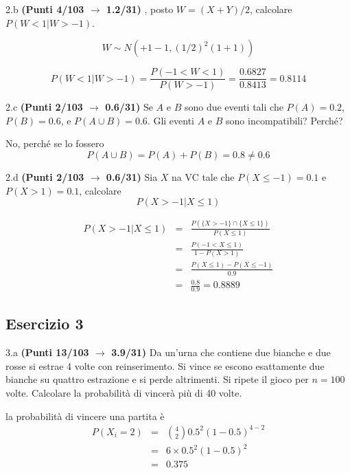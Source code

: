 \documentclass[
  11pt,
]{book}
\theoremstyle{mytheoremstyle}
\theoremstyle{mydefstyle}
\newenvironment{sol}
  {
  \begin{tcolorbox}[enhanced,breakable,arc=0.1mm,boxrule=1pt,colback=white,colframe=iblue,
  title=\bf \fontfamily{lmss}\selectfont \hspace{.5 cm} Soluzione,drop fuzzy shadow]

}{
\end{tcolorbox}
  }
\begin{document}
2.b \textbf{(Punti 4/103 \(\rightarrow\) 1.2/31)} , posto \(W=(X+Y)/2\), calcolare \(P(W<1|W>-1)\).

\begin{sol}
\[
W\sim N(+1-1,(1/2)^2(1+1))
\]

\[ 
P(W<1|W>-1)=\frac{P(-1<W<1)}{P(W>-1)}=\frac{0.6827}{0.8413}=0.8114
\]

\end{sol}

2.c \textbf{(Punti 2/103 \(\rightarrow\) 0.6/31)} Se \(A\) e \(B\) sono due eventi tali che \(P(A)=0.2\), \(P(B)=0.6\), e \(P(A\cup B)=0.6\). Gli eventi \(A\) e \(B\) sono incompatibili? Perché?

\begin{sol}
No, perché se lo fossero
\[
P(A\cup B)=P(A)+P(B)=0.8\ne 0.6
\]

\end{sol}

2.d \textbf{(Punti 2/103 \(\rightarrow\) 0.6/31)} Sia \(X\) na VC tale che \(P(X\le-1)=0.1\) e \(P(X>1)=0.1\), calcolare
\[
P(X>-1|X\le 1)
\]

\begin{sol}
\begin{eqnarray*}
  P(X>-1|X\le 1) &=&  \frac{P(\{X>-1\}\cap \{X\le 1\})}{P(X\le 1)}\\
                 &=&  \frac{P(-1 < X \le 1)}{1- P(X> 1)}\\
                 &=&  \frac{P(X\le 1)-P(X\le -1)}{0.9}\\
                 &=&  \frac{0.8}{0.9}=0.8889
\end{eqnarray*}

\end{sol}

\subsection{Esercizio 3}\label{esercizio-3-44}

3.a \textbf{(Punti 13/103 \(\rightarrow\) 3.9/31)} Da un'urna che contiene due bianche e due rosse si estrae 4 volte con reinserimento.
Si vince se escono esattamente due bianche su quattro estrazione e si perde altrimenti. Si ripete il gioco per \(n=100\) volte. Calcolare la probabilità di vincerà più di 40 volte.

la probabilità di vincere una partita è
\normalsize 
\begin{eqnarray*}
      P( X_i = 2 ) &=& \binom{ 4 }{ 2 } 0.5 ^{ 2 }(1- 0.5 )^{ 4 - 2 } \\                 &=& 6 \times 0.5 ^{ 2 }(1- 0.5 )^{ 2 } \\                 &=& 0.375 
   \end{eqnarray*}
\normalsize 
\end{document}
